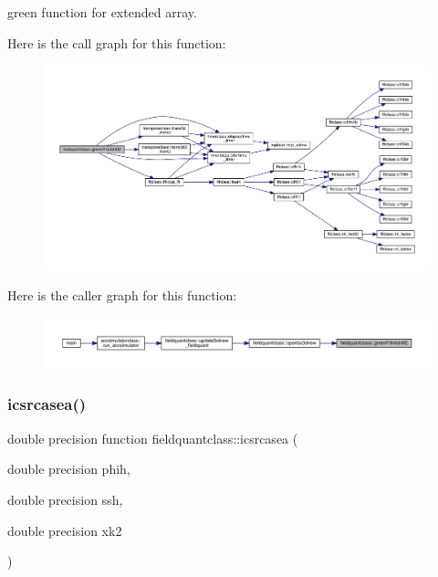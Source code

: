 green function for extended array. 

Here is the call graph for this function\+:
\nopagebreak
\begin{figure}[H]
\begin{center}
\leavevmode
\includegraphics[width=350pt]{namespacefieldquantclass_a25df6116d62bb56b5711333426dcd74d_cgraph}
\end{center}
\end{figure}
Here is the caller graph for this function\+:\nopagebreak
\begin{figure}[H]
\begin{center}
\leavevmode
\includegraphics[width=350pt]{namespacefieldquantclass_a25df6116d62bb56b5711333426dcd74d_icgraph}
\end{center}
\end{figure}
\mbox{\label{namespacefieldquantclass_a7431c26c185c399c546e1ac54043bad4}} 
\subsubsection{\texorpdfstring{icsrcasea()}{icsrcasea()}}
{\footnotesize\ttfamily double precision function fieldquantclass\+::icsrcasea (\begin{DoxyParamCaption}\item[{double precision}]{phih,  }\item[{double precision}]{ssh,  }\item[{double precision}]{xk2 }\end{DoxyParamCaption})}

